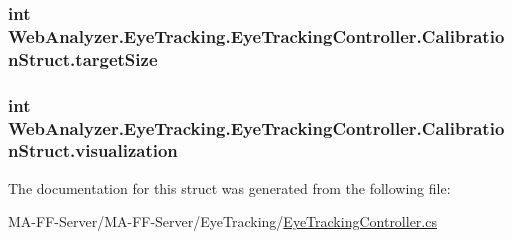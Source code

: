 \subsubsection[{target\+Size}]{\setlength{\rightskip}{0pt plus 5cm}int Web\+Analyzer.\+Eye\+Tracking.\+Eye\+Tracking\+Controller.\+Calibration\+Struct.\+target\+Size}\label{struct_web_analyzer_1_1_eye_tracking_1_1_eye_tracking_controller_1_1_calibration_struct_ad6fba3d6ac1ee64048863c0c45b17ec5}
\hypertarget{struct_web_analyzer_1_1_eye_tracking_1_1_eye_tracking_controller_1_1_calibration_struct_a47dcb619137477583cbb60b468ea86e0}{}
\subsubsection[{visualization}]{\setlength{\rightskip}{0pt plus 5cm}int Web\+Analyzer.\+Eye\+Tracking.\+Eye\+Tracking\+Controller.\+Calibration\+Struct.\+visualization}\label{struct_web_analyzer_1_1_eye_tracking_1_1_eye_tracking_controller_1_1_calibration_struct_a47dcb619137477583cbb60b468ea86e0}


The documentation for this struct was generated from the following file\+:\begin{DoxyCompactItemize}
\item 
M\+A-\/\+F\+F-\/\+Server/\+M\+A-\/\+F\+F-\/\+Server/\+Eye\+Tracking/\hyperlink{_eye_tracking_controller_8cs}{Eye\+Tracking\+Controller.\+cs}\end{DoxyCompactItemize}
